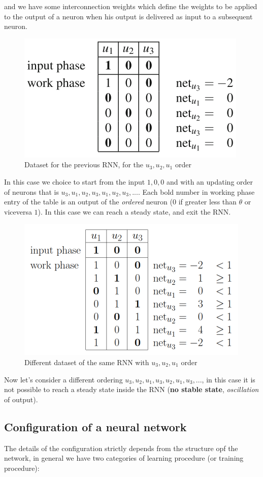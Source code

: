 \documentclass{article}
\begin{document}
and we have some interconnection weights which define the weights to be applied to the output
of a neuron when his output is delivered as input to a subsequent neuron.
\begin{figure}[H]
    \centering
    \includegraphics[scale=0.6]{images/RNN_simpl_ex1.png}
    \caption{Dataset for the previous RNN, for the $u_3,u_2,u_1$ order}
\end{figure}
In this case we choice to start from the input $1,0,0$ and with an updating order of
neurons that is $u_3,u_1,u_2,u_3,u_1,u_2,u_3,...$. Each bold number in working phase
entry of the table is an output of the \textit{ordered} neuron ($0$ if greater less than $\theta$
or viceversa $1$). In this case we can reach a steady state, and exit the RNN.
\begin{figure}[H]
    \centering
    \includegraphics[scale=0.6]{images/RNN_simpl_ex2.png}
    \caption{Different dataset of the same RNN with $u_3,u_2,u_1$ order}
\end{figure}
Now let's consider a different ordering $u_3,u_2,u_1,u_3,u_2,u_1,u_3,...$, in this case
it is not possible to reach a steady state inside the RNN (\textbf{no stable state}, \textit{
    oscillation} of output).

\subsection{Configuration of a neural network}
The details of the configuration strictly depends from the
structure opf the network, in general we have two categories of
learning procedure (or training procedure):
\end{document}
